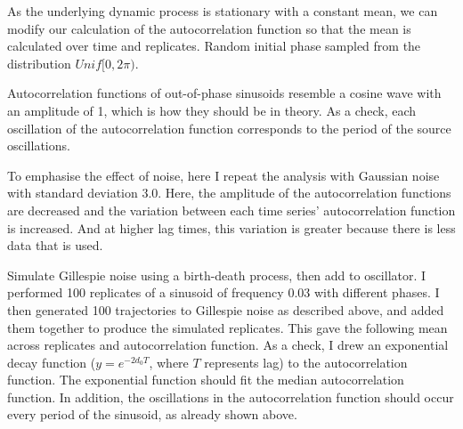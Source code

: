 As the underlying dynamic process is stationary with a constant mean, we can modify our calculation of the autocorrelation function so that the mean is calculated over time and replicates.
Random initial phase sampled from the distribution \(Unif[0,2\pi)\).

Autocorrelation functions of out-of-phase sinusoids resemble a cosine wave with an amplitude of 1, which is how they should be in theory.
As a check, each oscillation of the autocorrelation function corresponds to the period of the source oscillations.

To emphasise the effect of noise, here I repeat the analysis with Gaussian noise with standard deviation 3.0.
Here, the amplitude of the autocorrelation functions are decreased and the variation between each time series' autocorrelation function is increased.
And at higher lag times, this variation is greater because there is less data that is used.

Simulate Gillespie noise using a birth-death process, then add to oscillator.
I performed 100 replicates of a sinusoid of frequency 0.03 with different phases.
I then generated 100 trajectories to Gillespie noise as described above, and added them together to produce the simulated replicates.
This gave the following mean across replicates and autocorrelation function.
As a check, I drew an exponential decay function (\(y = e^{-2d_{0}T}\), where \(T\) represents lag) to the autocorrelation function.
The exponential function should fit the median autocorrelation function.
In addition, the oscillations in the autocorrelation function should occur every period of the sinusoid, as already shown above.

